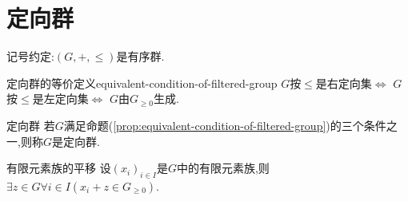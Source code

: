 \section{定向群}

记号约定:$\left(G,+,\leq\right)$是有序群.

\begin{proposition}{定向群的等价定义}{equivalent-condition-of-filtered-group}
	$G$按$\leqslant$是右定向集$\iff$ $G$按$\leqslant$是左定向集$\iff$ $G$由$G_{\geq 0}$生成.
\end{proposition}

\begin{definition}{定向群}{}
	若$G$满足命题(\cref{prop:equivalent-condition-of-filtered-group})的三个条件之一,则称$G$是定向群.
\end{definition}

\begin{proposition}{有限元素族的平移}{}
	设$\left(x_{i}\right)_{i\in I}$是$G$中的有限元素族,则$\exists z\in G\forall i\in I\left(x_{i}+z\in G_{\geq 0}\right)$.
\end{proposition}




